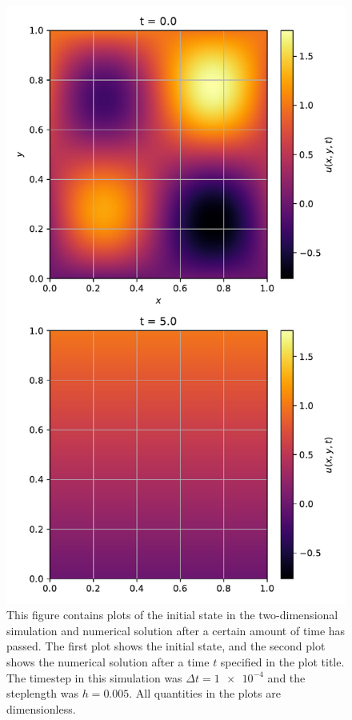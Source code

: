 \documentclass[reprint,english,notitlepage]{revtex4-1}  %
\begin{document}
\begin{figure}[H]
\centering
\includegraphics[width=\columnwidth]{../data/2D.pdf}
\caption{This figure contains plots of the initial state in the two-dimensional simulation and numerical solution after a certain amount of time has passed. The first plot shows the initial state, and the second plot shows the numerical solution after a time $t$ specified in the plot title. The timestep in this simulation was $\Delta t = \num{1e-4}$ and the steplength was $h = 0.005$. All quantities in the plots are dimensionless.} \label{fig:solution_2D}
\end{figure}
\end{document}
